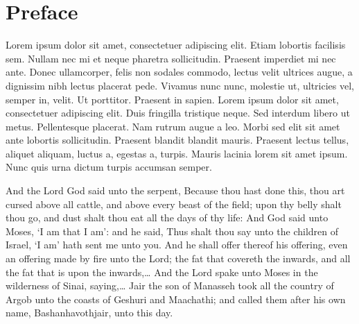 \chapter*{Preface}
    Lorem ipsum dolor sit amet, consectetuer adipiscing elit. Etiam
    lobortis facilisis sem. Nullam nec mi et neque pharetra
    sollicitudin. Praesent imperdiet mi nec ante. Donec ullamcorper,
    felis non sodales commodo, lectus velit ultrices augue, a
    dignissim nibh lectus placerat pede. Vivamus nunc nunc, molestie
    ut, ultricies vel, semper in, velit. Ut porttitor. Praesent in
    sapien. Lorem ipsum dolor sit amet, consectetuer adipiscing elit.
    Duis fringilla tristique neque. Sed interdum libero ut metus.
    Pellentesque placerat. Nam rutrum augue a leo. Morbi sed elit sit
    amet ante lobortis sollicitudin. Praesent blandit blandit mauris.
    Praesent lectus tellus, aliquet aliquam, luctus a, egestas a,
    turpis. Mauris lacinia lorem sit amet ipsum. Nunc quis urna dictum
    turpis accumsan semper.
    
     And the Lord God said unto the serpent, Because thou hast done this,
    thou art cursed above all cattle, and above every beast of the
    field; upon thy belly shalt thou go, and dust shalt thou eat all the
    days of thy life:
    And God said unto Moses, `I am that I am': and he said, Thus shalt
    thou say unto the children of Israel, `I am' hath sent me unto you.
    And he shall offer thereof his offering, even an offering made by
    fire unto the Lord; the fat that covereth the inwards, and all the
    fat that is upon the inwards,\ldots
    And the Lord spake unto Moses in the wilderness of Sinai,
    saying,\ldots
    Jair the son of Manasseh took all the country of Argob unto the
    coasts of Geshuri and Maachathi; and called them after his own name,
    Bashanhavothjair, unto this day.%


